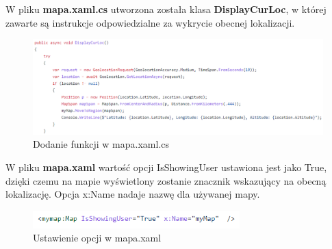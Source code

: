  W pliku \textbf{mapa.xaml.cs} utworzona została klasa \textbf{DisplayCurLoc}, w której zawarte są instrukcje odpowiedzialne za wykrycie obecnej lokalizacji.
 \newline
 \newline
 \begin{figure}[!htb]
 	\begin{center}
 		\includegraphics[width=18cm]{rys/mapa_xaml_cs.png}
 		\caption{Dodanie funkcji w mapa.xaml.cs}
 		\label{rys:rysunek017}
 	\end{center}
 \end{figure}
 
 W pliku \textbf{mapa.xaml} wartość opcji IsShowingUser ustawiona jest jako True, dzięki czemu na mapie wyświetlony zostanie znacznik wskazujący na obecną lokalizację. Opcja x:Name nadaje nazwę dla używanej mapy.
 \newline
\begin{figure}[!htb]
	\begin{center}
		\includegraphics[width=8cm]{rys/mapa_xaml.png}
		\caption{Ustawienie opcji w mapa.xaml}
		\label{rys:rysunek018}
	\end{center}
\end{figure}
   
  


